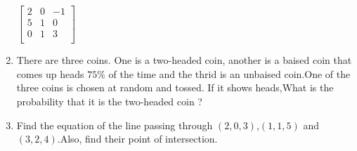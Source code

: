 \documentclass[2pt,-letter paper]{article}
\providecommand{\brak}[1]{\ensuremath{\left(#1\right)}}
\begin{document}
\begin{enumerate}
$\begin{bmatrix}
  2 & 0 & -1 \\
 5 & 1 & 0 \\
 0 & 1 & 3 \\
\end{bmatrix}$
\item There are three coins. One is a two-headed coin, another is a baised coin that comes up heads $75\%$ of the time and the thrid is an unbaised coin.One of the three coins is chosen at random and tossed. If it shows heads,What is the probability that it is the two-headed coin ?
\item Find the equation of the line passing through $\brak{2, 0, 3}$,$\brak{1, 1, 5}$ and $\brak{3, 2, 4}$.Also, find their point of intersection.
\end{enumerate}
\end{document}
